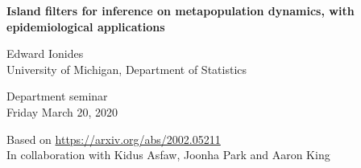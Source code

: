 \documentclass{beamer}
\begin{document}
\begin{frame}
\begin{center}
  {\Large\bf Island filters for inference on metapopulation dynamics, with epidemiological applications}



\vspace{2mm}

Edward Ionides\\
University of Michigan, Department of Statistics

\vspace{8mm}

Department seminar
\\
Friday March 20, 2020


\vspace{8mm}

Based on \url{https://arxiv.org/abs/2002.05211}\\
In collaboration with Kidus Asfaw, Joonha Park and Aaron King\\

\end{center}

\end{frame}

\newcommand\challengeSep{\vspace{2mm}}
\end{document}

